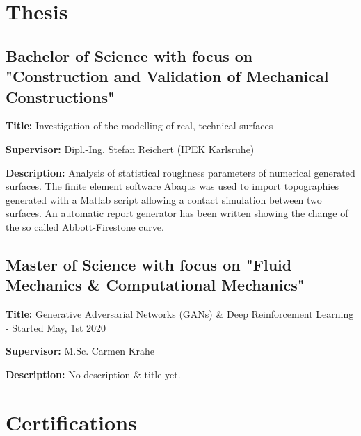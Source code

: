 \documentclass[11pt,a4paper,sans]{moderncv}        %
\begin{document}
\vspace{2pt}



\section{Thesis}
\vspace{3pt}

\subsection{Bachelor of Science with focus on "Construction and Validation of Mechanical Constructions"}

\vspace{3pt}

\textbf{Title:} Investigation of the modelling of real, technical surfaces \newline

\textbf{Supervisor:} Dipl.-Ing. Stefan Reichert (IPEK Karlsruhe) \newline

\textbf{Description:} Analysis of statistical roughness parameters of numerical generated surfaces. The finite element software Abaqus was used to import topographies generated with a Matlab script allowing a contact simulation between two surfaces. An automatic report generator has been written showing the change of the so called Abbott-Firestone curve.

\vspace{6pt}

\subsection{Master of Science with focus on "Fluid Mechanics \& Computational Mechanics"}

\vspace{3pt}

\textbf{Title:} Generative Adversarial Networks (GANs) \& Deep Reinforcement Learning - Started May, 1st 2020 \newline

\textbf{Supervisor:} M.Sc. Carmen Krahe \newline

\textbf{Description:} No description \& title yet.

\section{Certifications}
\end{document}
